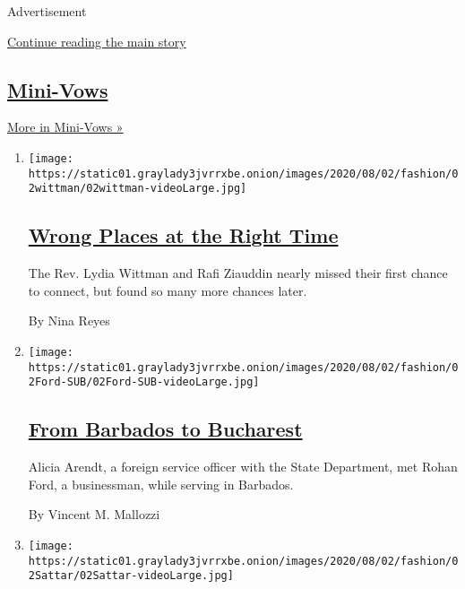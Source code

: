 Advertisement

\protect\hyperlink{after-mid1}{Continue reading the main story}

\hypertarget{mini-vows}{%
\subsection{\texorpdfstring{\href{/column/mini-vows}{Mini-Vows}}{Mini-Vows}}\label{mini-vows}}

\href{/column/mini-vows}{More in Mini-Vows »}

\begin{enumerate}
\def\labelenumi{\arabic{enumi}.}
\item
  \texttt{[image: https://static01.graylady3jvrrxbe.onion/images/2020/08/02/fashion/02wittman/02wittman-videoLarge.jpg]}

  \hypertarget{wrong-places-at-the-right-time}{%
  \subsection{\texorpdfstring{\href{/2020/07/31/fashion/weddings/wrong-places-at-the-right-time.html}{Wrong
  Places at the Right
  Time}}{Wrong Places at the Right Time}}\label{wrong-places-at-the-right-time}}

  The Rev. Lydia Wittman and Rafi Ziauddin nearly missed their first
  chance to connect, but found so many more chances later.

  By Nina Reyes
\item
  \texttt{[image: https://static01.graylady3jvrrxbe.onion/images/2020/08/02/fashion/02Ford-SUB/02Ford-SUB-videoLarge.jpg]}

  \hypertarget{from-barbados-to-bucharest}{%
  \subsection{\texorpdfstring{\href{/2020/07/31/fashion/weddings/from-barbados-to-bucharest.html}{From
  Barbados to
  Bucharest}}{From Barbados to Bucharest}}\label{from-barbados-to-bucharest}}

  Alicia Arendt, a foreign service officer with the State Department,
  met Rohan Ford, a businessman, while serving in Barbados.

  By Vincent M. Mallozzi
\item
  \texttt{[image: https://static01.graylady3jvrrxbe.onion/images/2020/08/02/fashion/02Sattar/02Sattar-videoLarge.jpg]}

  \hypertarget{taking-a-leap-of-faith-in-new-england}{%
}
\end{enumerate}
